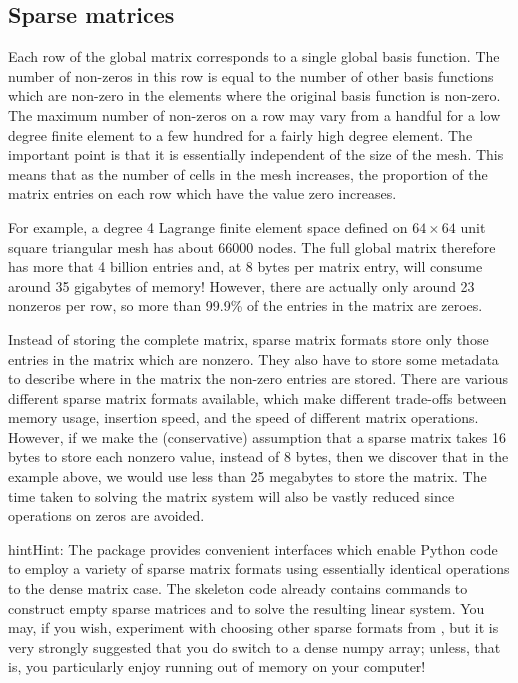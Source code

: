 \documentclass{book}
\begin{document}
\subsection{Sparse matrices}
\label{\detokenize{6_finite_element_problems:sparse-matrices}}
Each row of the global matrix corresponds to a single global basis
function. The number of non-zeros in this row is equal to the number
of other basis functions which are non-zero in the elements where the
original basis function is non-zero. The maximum number of non-zeros
on a row may vary from a handful for a low degree finite element to a
few hundred for a fairly high degree element. The important point is
that it is essentially independent of the size of the mesh. This means
that as the number of cells in the mesh increases, the proportion of
the matrix entries on each row which have the value zero increases.

For example, a degree 4 Lagrange finite element space defined on
\(64\times 64\) unit square triangular mesh has about 66000 nodes. The
full global matrix therefore has more that 4 billion entries and, at 8
bytes per matrix entry, will consume around 35 gigabytes of memory!
However, there are actually only around 23 nonzeros per row, so more
than 99.9\% of the entries in the matrix are zeroes.

Instead of storing the complete matrix, sparse matrix formats store
only those entries in the matrix which are nonzero. They also have to
store some metadata to describe where in the matrix the non-zero
entries are stored. There are various different sparse matrix formats
available, which make different trade-offs between memory usage,
insertion speed, and the speed of different matrix
operations. However, if we make the (conservative) assumption that a
sparse matrix takes 16 bytes to store each nonzero value, instead of 8
bytes, then we discover that in the example above, we would use less
than 25 megabytes to store the matrix. The time taken to solving the
matrix system will also be vastly reduced since operations on zeros
are avoided.

\begin{sphinxadmonition}{hint}{Hint:}
The  package provides convenient interfaces
which enable Python code to employ a variety of sparse matrix
formats using essentially identical operations to the dense matrix
case. The skeleton code already contains commands to construct
empty sparse matrices and to solve the resulting linear system. You
may, if you wish, experiment with choosing other sparse formats
from , but it is very strongly suggested that
you do  switch to a dense numpy array; unless, that is, you
particularly enjoy running out of memory on your computer!
\end{sphinxadmonition}
\end{document}
